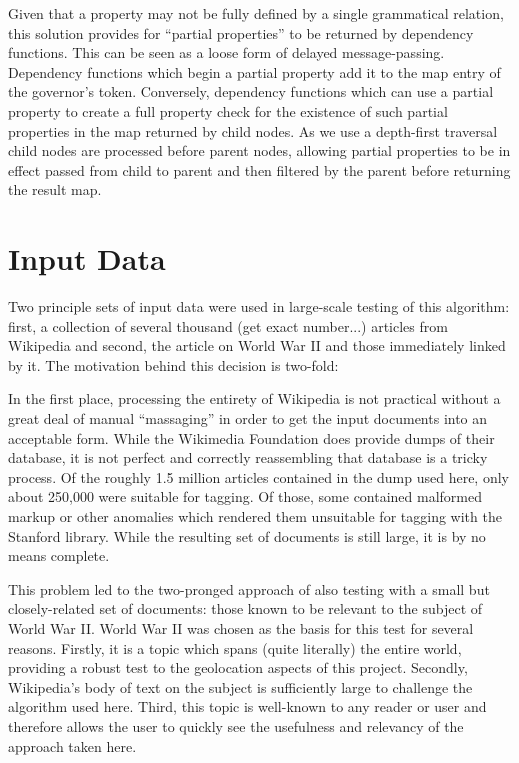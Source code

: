 \documentclass[11pt]{article}
\begin{document}
Given that a property may not be fully defined by a single grammatical relation, this solution provides for ``partial properties'' to be returned by dependency functions.  This can be seen as a loose form of delayed message-passing.  Dependency functions which begin a partial property add it to the map entry of the governor's token.  Conversely, dependency functions which can use a partial property to create a full property check for the existence of such partial properties in the map returned by child nodes.  As we use a depth-first traversal child nodes are processed before parent nodes, allowing partial properties to be in effect passed from child to parent and then filtered by the parent before returning the result map.

\section{Input Data}

Two principle sets of input data were used in large-scale testing of this algorithm: first, a collection of several thousand (get exact number...) articles from Wikipedia and second, the article on World War II and those immediately linked by it.  The motivation behind this decision is two-fold:

In the first place, processing the entirety of Wikipedia is not practical without a great deal of manual ``massaging'' in order to get the input documents into an acceptable form.  While the Wikimedia Foundation does provide dumps of their database, it is not perfect and correctly reassembling that database is a tricky process.  Of the roughly 1.5 million articles contained in the dump used here, only about 250,000 were suitable for tagging.  Of those, some contained malformed markup or other anomalies which rendered them unsuitable for tagging with the Stanford library.  While the resulting set of documents is still large, it is by no means complete.

This problem led to the two-pronged approach of also testing with a small but closely-related set of documents: those known to be relevant to the subject of World War II.  World War II was chosen as the basis for this test for several reasons.  Firstly, it is a topic which spans (quite literally) the entire world, providing a robust test to the geolocation aspects of this project.  Secondly, Wikipedia's body of text on the subject is sufficiently large to challenge the algorithm used here.  Third, this topic is well-known to any reader or user and therefore allows the user to quickly see the usefulness and relevancy of the approach taken here.
\end{document}
